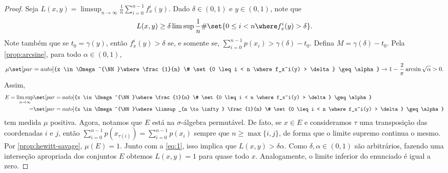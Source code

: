 \documentclass[../fapesp0]{subfiles}
\begin{document}
\begin{proof}
  Seja \(L(x,y) = \limsup_{n \to \infty}\frac{1}{n}\sum_{i = 0}^{n - 1}f_x^i(y)\). Dado \(\delta \in (0,1)\) e \(y \in (0,1)\), note que
  \begin{equation}\label{eq:1}
    L(x,y)
    \geq \delta \limsup \frac{1}{n} \# \set{0 \leq i < n \where f_x^i(y) > \delta}.
  \end{equation}
  Note também que se \(t_0 = \gamma(y)\), então \(f_x^i(y) > \delta\) se, e somente se, \(\sum_{i = 0}^{n - 1}p(x_i) > \gamma(\delta) -t_0\). Defina \(M = \gamma(\delta) - t_0\). Pela \cref{prop:arcsine}, para todo \(\alpha \in (0,1)\),
  \begin{equation*}
    \mu\set[par = auto]{x \in \Omega^{\NN}\where
      \frac{1}{n} \# \set{0 \leq i < n \where f_x^i(y) > \delta} \geq \alpha} \to 1 - \frac{2}{\pi}\arcsin \sqrt{\alpha} > 0.
  \end{equation*}
  Assim,
  \begin{align*}
    E = \limsup_{n \to \infty}&\set[par = auto]{x \in \Omega^{\NN}\where
      \frac{1}{n} \# \set{0 \leq i < n \where f_x^i(y) > \delta} \geq \alpha}\\
    = &\set[par = auto]{x \in \Omega^{\NN}\where\limsup_{n \to \infty}
      \frac{1}{n} \# \set{0 \leq i < n \where f_x^i(y) > \delta} \geq \alpha}
  \end{align*}
  tem medida \(\mu\) positiva. Agora, notamos que \(E\) está na \(\sigma\)-álgebra permutável. De fato, se \(x \in E\) e consideramos \(\tau\) uma transposição das coordenadas \(i\) e \(j\), então \(\sum_{i = 0}^{n - 1}p(x_{\tau(i)}) = \sum_{i = 0}^{n - 1}p(x_i)\) sempre que \(n \geq \max \{ i,j \}\), de forma que o limite supremo continua o mesmo. Por \cref{prop:hewitt-savage}, \(\mu(E) = 1\). Junto com a \cref{eq:1}, isso implica que \(L(x,y) > \delta \alpha\). Como \(\delta, \alpha \in (0,1)\) são arbitrários, fazendo uma interseção apropriada dos conjuntos \(E\) obtemos \(L(x,y) = 1\) para quase todo \(x\). Analogamente, o limite inferior do enunciado é igual a zero.
\end{proof}
\end{document}
